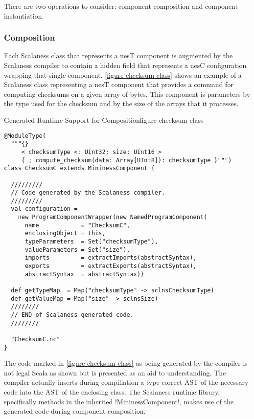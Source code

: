 There are two operations to consider: component composition and component instantiation.

\subsubsection{Composition}
\label{section-composition}

Each Scalaness class that represents a nesT component is augmented by the Scalaness compiler to
contain a hidden field that represents a nesC configuration wrapping that single component.
\autoref{figure-checksum-class} shows an example of a Scalaness class representing a nesT
component that provides a command for computing checksums on a given array of bytes. This
component is parameters by the type used for the checksum and by the size of the arrays that it
processes.

\singlespace
\begin{fpfig}[tbhp]{Generated Runtime Support for Composition}{figure-checksum-class}
{
\begin{lstlisting}[language=scalaness]
@ModuleType(
  """{}
     < checksumType <: UInt32; size: UInt16 >
     { ; compute_checksum(data: Array[UInt8]): checksumType }""")
class ChecksumC extends MininessComponent {

  /////////
  // Code generated by the Scalaness compiler.
  /////////
  val configuration =
    new ProgramComponentWrapper(new NamedProgramComponent(
      name            = "ChecksumC",
      enclosingObject = this,
      typeParameters  = Set("checksumType"),
      valueParameters = Set("size"),
      imports         = extractImports(abstractSyntax),
      exports         = extractExports(abstractSyntax),
      abstractSyntax  = abstractSyntax))
    
  def getTypeMap  = Map("checksumType" -> sclnsChecksumType)
  def getValueMap = Map("size" -> sclnsSize)
  ////////
  // END of Scalaness generated code.
  //////// 
           
  "ChecksumC.nc"
}
\end{lstlisting}
}
\end{fpfig}
\primaryspacing

The code marked in \autoref{figure-checksum-class} as being generated by the compiler is not
legal Scala as shown but is presented as an aid to understanding. The compiler actually inserts
during compiliation a type correct AST of the necessary code into the AST of the enclosing
class. The Scalaness runtime library, specifically methods in the inherited !MininessComponent!,
makes use of the generated code during component composition.

